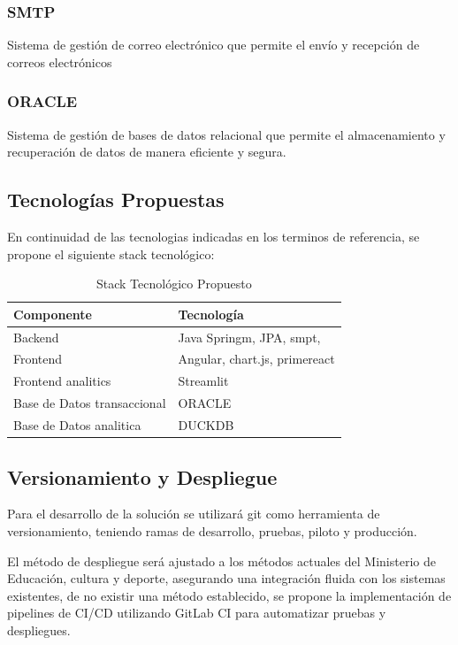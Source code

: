 \subsubsection{SMTP}
Sistema de gestión de correo electrónico que permite el envío y recepción de correos electrónicos

\subsubsection{ORACLE}
Sistema de gestión de bases de datos relacional que permite el almacenamiento y recuperación de datos de manera eficiente y segura.

\subsection{Tecnologías Propuestas}
En continuidad de las tecnologias indicadas en los terminos de referencia, se propone el siguiente stack tecnológico:

\begin{table}[h]
\centering
\begin{tabular}{|l|l|}
\hline
\textbf{Componente} & \textbf{Tecnología} \\
\hline
Backend & Java Springm, JPA, smpt,  \\
\hline
Frontend & Angular, chart.js, primereact\\
\hline
Frontend analitics & Streamlit \\
\hline
Base de Datos transaccional & ORACLE \\
\hline
Base de Datos analitica & DUCKDB \\
\hline
\end{tabular}
\caption{Stack Tecnológico Propuesto}
\label{tab:stack_tecnologico}
\end{table}

\subsection{Versionamiento y Despliegue}

Para el desarrollo de la solución se utilizará git como herramienta de versionamiento, teniendo ramas de desarrollo, pruebas, piloto y producción.

El método de despliegue será ajustado a los métodos actuales del Ministerio de Educación, cultura y deporte, asegurando una integración fluida con los sistemas existentes, de no existir una método establecido, se propone la implementación de pipelines de CI/CD utilizando GitLab CI para automatizar pruebas y despliegues.